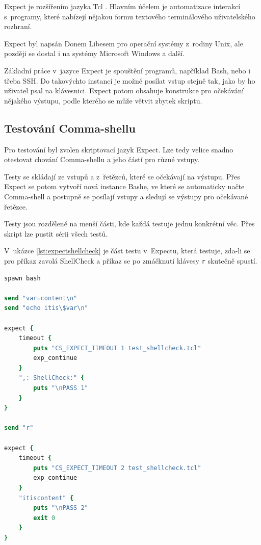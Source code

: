 \documentclass[thesis=M,czech]{FITthesis}[2012/06/26]
\begin{document}
Expect \cite{expect} je rozšířením jazyka Tcl \cite{tcl}. Hlavním účelem je automatizace interakcí s~programy, které nabízejí nějakou formu textového terminálového uživatelského rozhraní.

Expect byl napsán Donem Libesem pro operační systémy z~rodiny Unix, ale později se dostal i na systémy Microsoft Windows a další.

Základní práce v~jazyce Expect je spouštění programů, například Bash, nebo i třeba SSH. Do takovýchto instancí je možné posílat vstup stejně tak, jako by ho uživatel psal na klávesnici. Expect potom obsahuje konstrukce pro očekávání nějakého výstupu, podle kterého se může větvit zbytek skriptu.



\subsection{Testování Comma-shellu}

Pro testování byl zvolen skriptovací jazyk Expect. Lze tedy velice snadno otestovat chování Comma-shellu a jeho částí pro různé vstupy.

Testy se skládají ze vstupů a z~řetězců, které se očekávají na výstupu. Přes Expect se potom vytvoří nová instance Bashe, ve které se automaticky načte Comma-shell a postupně se posílají vstupy a sledují se výstupy pro očekávané řetězce.

Testy jsou rozdělené na menší části, kde každá testuje jednu konkrétní věc. Přes skript lze pustit sérii všech testů.

V~ukázce \ref{lst:expectshellcheck} je část testu v~Expectu, která testuje, zda-li se pro příkaz zavolá ShellCheck a příkaz se po zmáčknutí klávesy \texttt{r} skutečně spustí.


\noindent
\begin{minipage}{\linewidth}
\begin{lstlisting}[language=tcl, caption={Expect test}, label={lst:expectshellcheck}]
spawn bash

send "var=content\n"
send "echo itis\$var\n"

expect {
	timeout {
		puts "CS_EXPECT_TIMEOUT 1 test_shellcheck.tcl"
		exp_continue
	}
	",: ShellCheck:" {
		puts "\nPASS 1"
	}
}

send "r"

expect {
	timeout {
		puts "CS_EXPECT_TIMEOUT 2 test_shellcheck.tcl"
		exp_continue
	}
	"itiscontent" {
		puts "\nPASS 2"
		exit 0
	}
}
\end{lstlisting}
\end{minipage}
\end{document}
